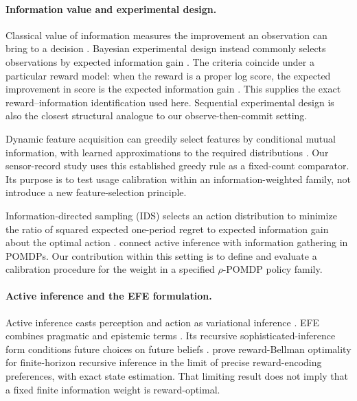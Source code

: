 \documentclass[runningheads]{llncs}
\begin{document}
\paragraph{Information value and experimental design.}
Classical value of information measures the improvement an observation can bring to a decision \citep{howard1966}. Bayesian experimental design instead commonly selects observations by expected information gain \citep{lindley1956,foster2021dad}. The criteria coincide under a particular reward model: when the reward is a proper log score, the expected improvement in score is the expected information gain \citep{bernardo1979}. This supplies the exact reward--information identification used here. Sequential experimental design is also the closest structural analogue to our observe-then-commit setting.

Dynamic feature acquisition can greedily select features by conditional mutual information, with learned approximations to the required distributions \citep{covert2023}. Our sensor-record study uses this established greedy rule as a fixed-count comparator. Its purpose is to test usage calibration within an information-weighted family, not introduce a new feature-selection principle.

Information-directed sampling (IDS) selects an action distribution to minimize the ratio of squared expected one-period regret to expected information gain about the optimal action \citep{russo2014}. \citet{walraven2024} connect active inference with information gathering in POMDPs. Our contribution within this setting is to define and evaluate a calibration procedure for the weight in a specified $\rho$-POMDP policy family.

\paragraph{Active inference and the EFE formulation.}
Active inference casts perception and action as variational inference \citep{friston2010,parr2022}. EFE combines pragmatic and epistemic terms \citep{friston2015,parr2019,dacosta2020}. Its recursive sophisticated-inference form conditions future choices on future beliefs \citep{friston2021}. \citet{dacosta2020b} prove reward-Bellman optimality for finite-horizon recursive inference in the limit of precise reward-encoding preferences, with exact state estimation. That limiting result does not imply that a fixed finite information weight is reward-optimal.
\end{document}
